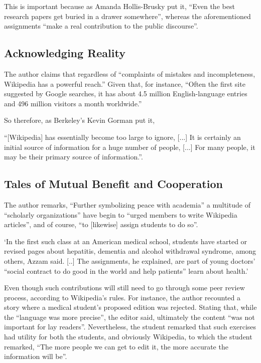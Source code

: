 This is important because as Amanda Hollis-Brusky put it, ``Even the best research papers get buried in a drawer somewhere'', whereas the aforementioned assignments ``make a real contribution to the public discourse''.



\subsection{Acknowledging Reality}

The author claims that regardless of ``complaints of mistakes and incompleteness, Wikipedia has a powerful reach.'' Given that, for instance, ``Often the first site suggested by Google searches, it has about 4.5 million English-language entries and 496 million visitors a month worldwide.''

So therefore, as Berkeley’s Kevin Gorman put it,

``[Wikipedia] has essentially become too large to ignore, [...] It is certainly an initial source of information for a huge number of people, [...] For many people, it may be their primary source of information.''. 


\subsection{Tales of Mutual Benefit and Cooperation}

The author remarks, ``Further symbolizing peace with academia'' a multitude of ``scholarly organizations'' have begin to ``urged members to write Wikipedia articles'', and of course, ``to [likewise] assign students to do so''.

`In the first such class at an American medical school, students have started or revised pages about hepatitis, dementia and alcohol withdrawal syndrome, among others, Azzam said. [..] The assignments, he explained, are part of young doctors’ “social contract to do good in the world and help patients” learn about health.'

Even though such contributions will still need to go through some peer review process, according to Wikipedia's rules. For instance, the author recounted a story where a medical student's proposed edition was rejected. Stating that, while the ``language was more precise'', the editor said, ultimately the content ``was not important for lay readers''. Nevertheless, the student remarked that such exercises had utility for both the students, and obviously Wikipedia, to which the student remarked, ``The more people we can get to edit it, the more accurate the information will be''.


